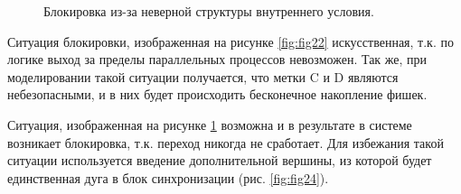 \begin{figure}
	\begin{minipage}[H]{0.49\linewidth}
	\end{minipage}
	\hfill
	\begin{minipage}[H]{0.49\linewidth}
	\end{minipage}
	\caption{Блокировка из-за неверной структуры внутреннего условия.}	
	\label{fig:fig23}	
\end{figure}

Ситуация блокировки, изображенная на рисунке \ref{fig:fig22} искусственная, т.к. по логике выход за пределы параллельных процессов невозможен. Так же, при моделировании такой ситуации получается, что метки C и D являются небезопасными, и в них будет происходить бесконечное накопление фишек.

Ситуация, изображенная на рисунке \ref{fig:fig23} возможна и в результате в системе возникает блокировка, т.к. переход никогда не сработает. Для избежания такой ситуации используется введение дополнительной вершины, из которой будет единственная дуга в блок синхронизации (рис. \ref{fig:fig24}).


